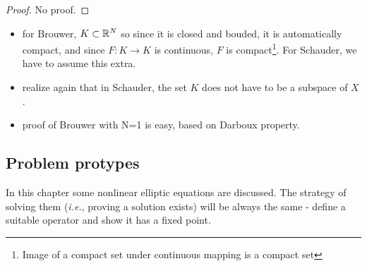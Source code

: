 \documentclass{article}
\begin{document}
\begin{proof}
	No proof.
\end{proof}

\begin{remark}
\begin{itemize}
	\item for Brouwer, $K \subset {\mathbb R}^N$ so since it is closed and bouded, it is automatically compact, and since $F: K \to K$ is continuous, $F$ is compact\footnote{Image of a compact set under continuous mapping is a compact set}. For Schauder, we have to assume this extra.
	\item realize again that in Schauder, the set $K$ does not have to be a subspace of $X$.
	\item proof of Brouwer with N=1 is easy, based on Darboux property.
\end{itemize}
\end{remark}

\subsection{Problem protypes}
\label{sec:prototypes}

In this chapter some nonlinear elliptic equations are discussed. The strategy of solving them (\textit{i.e.}, proving a solution exists) will be always the same - define a suitable operator and show it has a fixed point.
\end{document}
